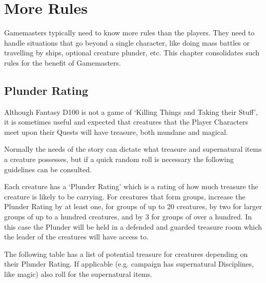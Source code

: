 \chapter{More Rules}
\label{ch:more-rules}

Gamemasters typically need to know more rules than the players. They need to handle situations that go beyond a single character, like doing mass battles or travelling by ships, optional creature plunder, etc. This chapter consolidates such rules for the benefit of Gamemasters.


\section{Plunder Rating}

Although Fantasy D100 is not a game of ‘Killing Things and Taking their Stuff’, it is sometimes useful and expected that creatures that the Player Characters meet upon their Quests will have treasure, both mundane and magical.

Normally the needs of the story can dictate what treasure and supernatural items a creature possesses, but if a quick random roll is necessary the following guidelines can be consulted.

Each creature has a ‘Plunder Rating’ which is a rating of how much treasure the creature is likely to be carrying. For creatures that form groups, increase the Plunder Rating by at least one, for groups of up to 20 creatures, by two for larger groups of up to a hundred creatures, and by 3 for groups of over a hundred. In this case the Plunder will be held in a defended and guarded treasure room which the leader of the creatures will have access to.

The following table has a list of potential treasure for creatures depending on their Plunder Rating. If applicable (e.g. campaign has supernatural Disciplines, like magic) also roll for the supernatural items.

